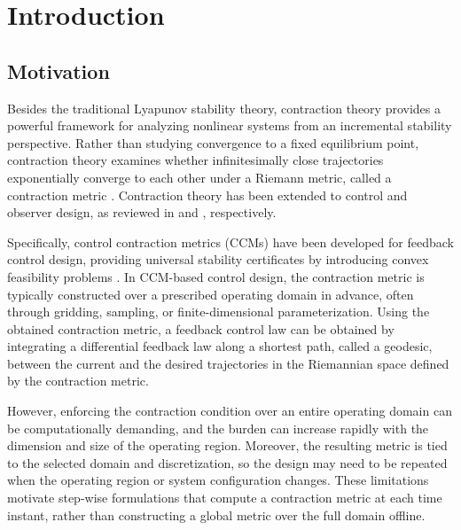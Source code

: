 \documentclass{ifacconf}
\begin{document}
\section{Introduction}

\subsection{Motivation}

Besides the traditional Lyapunov stability theory, contraction theory provides a powerful framework for analyzing nonlinear systems from an incremental stability perspective.
Rather than studying convergence to a fixed equilibrium point, contraction theory examines whether infinitesimally close trajectories exponentially converge to each other under a Riemann metric, called a contraction metric \citep{LOHMILLER:1998aa}.
Contraction theory has been extended to control and observer design, as reviewed in \citep{Tsukamoto:2021aa} and \citep{Bernard:2022aa}, respectively.

Specifically, control contraction metrics (CCMs) have been developed for feedback control design, providing universal stability certificates by introducing convex feasibility problems \citep{Manchester:2014aa,Manchester:2017aa}.
In CCM-based control design, the contraction metric is typically constructed over a prescribed operating domain in advance, often through gridding, sampling, or finite-dimensional parameterization.
Using the obtained contraction metric, a feedback control law can be obtained by integrating a differential feedback law along a shortest path, called a geodesic, between the current and the desired trajectories in the Riemannian space defined by the contraction metric.

However, enforcing the contraction condition over an entire operating domain can be computationally demanding, and the burden can increase rapidly with the dimension and size of the operating region.
Moreover, the resulting metric is tied to the selected domain and discretization, so the design may need to be repeated when the operating region or system configuration changes.
These limitations motivate step-wise formulations that compute a contraction metric at each time instant, rather than constructing a global metric over the full domain offline.
\end{document}
